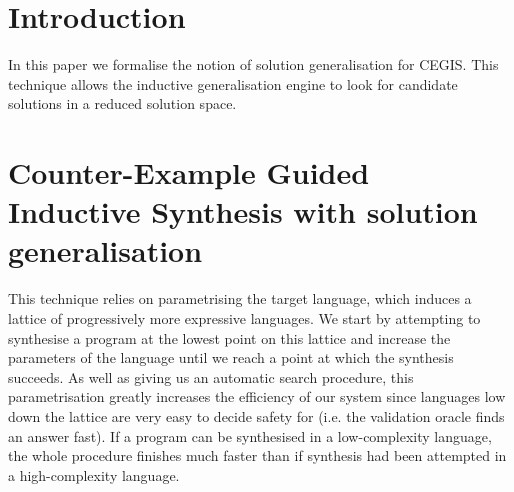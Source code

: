 \documentclass[runningheads,a4paper]{llncs}
\begin{document}
\section{Introduction}
In this paper we formalise the notion of solution generalisation for CEGIS. 
This technique allows the inductive generalisation engine to look for 
candidate solutions in a reduced solution space.

\section{Counter-Example Guided Inductive Synthesis with solution generalisation}

This technique relies on parametrising the target language, which
induces a lattice of progressively more expressive languages.  We
start by attempting to synthesise a program at the lowest point on
this lattice and increase the parameters of the language until we
reach a point at which the synthesis succeeds. As well as giving us an
automatic search procedure, this parametrisation greatly increases the
efficiency of our system since languages low down the lattice are very
easy to decide safety for (i.e. the validation oracle finds an answer
fast). If a program can be synthesised in a low-complexity language,
the whole procedure finishes much faster than if synthesis had been
attempted in a high-complexity language.
\end{document}
